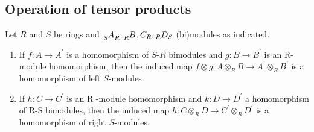 \subsection{Operation of tensor products} %

\begin{theorem}
    Let $R$ and $S$ be rings and $ \tensor[_S]{A}{_R}  ,\tensor[_R]{B}{}, C_{{R}},{ }_{{R}} {D}_{{S}}$ (bi)modules as indicated.

    \begin{enumerate}
        \item
              If ${f}: A \rightarrow A^{\prime}$ is a homomorphism of ${S}$-${R}$ bimodules and ${g}: B \rightarrow B^{\prime}$ is an R-module homomorphism, then the induced map ${f} \otimes {g}: A \otimes_{{R}} B \rightarrow A^{\prime} \otimes_{{R}} B^{\prime}$ is a homomorphism of left $S$-modules.
        \item
              If ${h}: C \rightarrow C^{\prime}$ is an R -module homomorphism and ${k}: {D} \rightarrow {D}^{\prime}$ a homomorphism of R-S bimodules, then the induced map ${h} : C \otimes_R {D} \rightarrow C^{\prime} \otimes_{{R}} {D}^{\prime}$ is a homomorphism of right $S$-modules.
    \end{enumerate}
\end{theorem}


